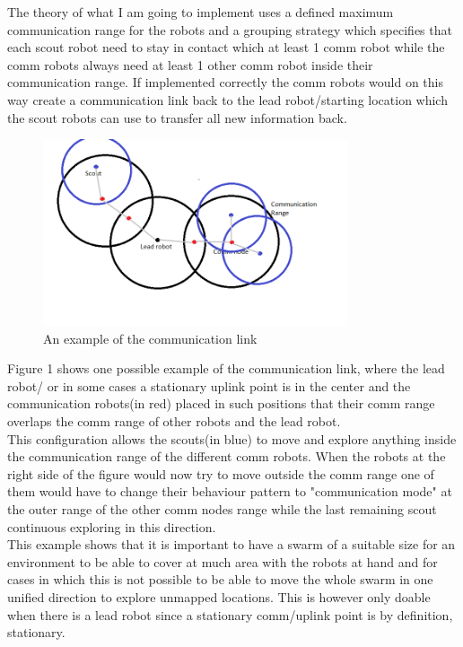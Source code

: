 The theory of what I am going to implement uses a defined maximum communication range for the robots and a grouping strategy which specifies that each scout robot need to stay in contact which at least 1 comm robot while the comm robots always need at least 1 other comm robot inside their communication range. If implemented correctly the comm robots would on this way create a communication link back to the lead robot/starting location which the scout robots can use to transfer all new information back.\\

\begin{figure}[h]
\centering
\includegraphics[width = 0.8\textwidth]{../../figures/comm_example.png} 
\caption{An example of the communication link}
\label{Figure 1}
\end{figure}

Figure 1 shows one possible example of the communication link, where the lead robot/ or in some cases a stationary uplink point is in the center and the communication robots(in red) placed in such positions that their comm range overlaps the comm range of other robots and the lead robot. \\
This configuration allows the scouts(in blue) to move and explore anything inside the communication range of the different comm robots. When the robots at the right side of the figure would now try to move outside the comm range one of them would have to change their behaviour pattern to "communication mode" at the outer range of the other comm nodes range while the last remaining scout continuous exploring in this direction. \\
This example shows that it is important to have a swarm of a suitable size for an environment to be able to cover at much area with the robots at hand and for cases in which this is not possible to be able to move the whole swarm in one unified direction to explore unmapped locations. This is however only doable when there is a lead robot since a stationary comm/uplink point is by definition, stationary.\\

